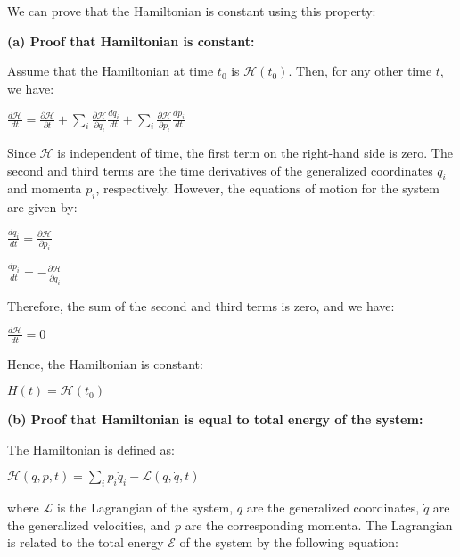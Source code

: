 \documentclass[12pt, a4paper]{article} %
\begin{document}
We can prove that the Hamiltonian is constant using this property:

{\bf (a) Proof that Hamiltonian is constant:}

Assume that the Hamiltonian at time $t_0$ is $\mathscr{H}(t_0)$. Then, for any other time $t$, we have:

\begin{center}
    $\displaystyle \frac{d\mathscr{H}}{dt} = \frac{\partial \mathscr{H}}{\partial t} + \sum_i \frac{\partial \mathscr{H}}{\partial q_i}\frac{dq_i}{dt} + \sum_i \frac{\partial\mathscr{H}}{\partial p_i}\frac{dp_i}{dt}$
\end{center}

Since $\mathscr{H}$ is independent of time, the first term on the right-hand side is zero. The second and third terms are the time derivatives of the generalized coordinates $q_i$ and momenta $p_i$, respectively. However, the equations of motion for the system are given by:

\begin{center}
    $\displaystyle \frac{dq_i}{dt} = \frac{\partial \mathscr{H}}{\partial p_i}$
\end{center}

\begin{center}
    $\displaystyle \frac{dp_i}{dt} = -\frac{\partial \mathscr{H}}{\partial q_i}$
\end{center}

Therefore, the sum of the second and third terms is zero, and we have:

\begin{center}
    $\displaystyle \frac{d\mathscr{H}}{dt} = 0$
\end{center}

Hence, the Hamiltonian is constant:

\begin{center}
    $\displaystyle H(t) = \mathscr{H}(t_0)$
\end{center}

\BgThispage

{\bf (b) Proof that Hamiltonian is equal to total energy of the system:}

The Hamiltonian is defined as:

\begin{center}
    $\displaystyle \mathscr{H}(q,p,t) = \sum_i p_i\dot{q}_i - \mathscr{L}(q,\dot{q},t)$
\end{center}

where $\mathscr{L}$ is the Lagrangian of the system, $q$ are the generalized coordinates, $\dot{q}$ are the generalized velocities, and $p$ are the corresponding momenta. The Lagrangian is related to the total energy $\mathscr{E}$ of the system by the following equation:
\end{document}

